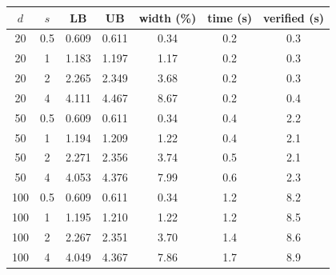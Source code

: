 \begin{tabular}{cc ccc cc}
\toprule
$d$ & $s$ & LB & UB & width (\%) & time (s) & verified (s)\\
\midrule
20 & 0.5 & 0.609 & 0.611 & 0.34 & 0.2 & 0.3\\
20 & 1 & 1.183 & 1.197 & 1.17 & 0.2 & 0.3\\
20 & 2 & 2.265 & 2.349 & 3.68 & 0.2 & 0.3\\
20 & 4 & 4.111 & 4.467 & 8.67 & 0.2 & 0.4\\
50 & 0.5 & 0.609 & 0.611 & 0.34 & 0.4 & 2.2\\
50 & 1 & 1.194 & 1.209 & 1.22 & 0.4 & 2.1\\
50 & 2 & 2.271 & 2.356 & 3.74 & 0.5 & 2.1\\
50 & 4 & 4.053 & 4.376 & 7.99 & 0.6 & 2.3\\
100 & 0.5 & 0.609 & 0.611 & 0.34 & 1.2 & 8.2\\
100 & 1 & 1.195 & 1.210 & 1.22 & 1.2 & 8.5\\
100 & 2 & 2.267 & 2.351 & 3.70 & 1.4 & 8.6\\
100 & 4 & 4.049 & 4.367 & 7.86 & 1.7 & 8.9\\
\bottomrule
\end{tabular}